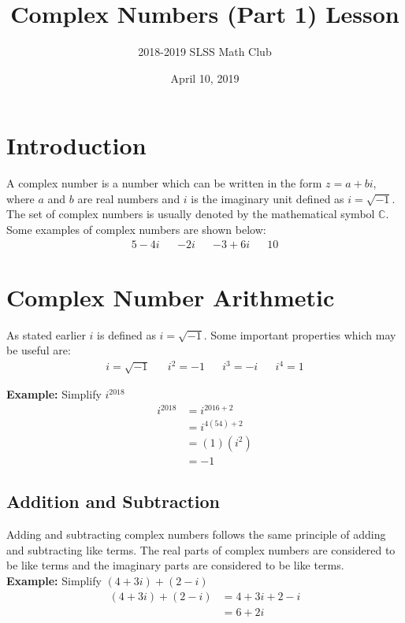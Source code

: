 \documentclass[12pt]{article}
\title{Complex Numbers (Part 1) Lesson\vspace{-3mm}}
\author{2018-2019 SLSS Math Club\vspace{-5mm}}
\date{April 10, 2019\vspace{-5mm}}
\begin{document}
\maketitle

\section{Introduction}
A complex number is a number which can be written in the form $z=a + bi$, where $a$ and $b$ are real numbers and $i$ is the imaginary unit defined as $i = \sqrt{-1}$. The set of complex numbers is usually denoted by the mathematical symbol $\mathbb{C}$. Some examples of complex numbers are shown below:
\begin{align*}
    5 - 4i && -2i && -3 + 6i && 10
\end{align*}

\section{Complex Number Arithmetic}
As stated earlier $i$ is defined as $i = \sqrt{-1}$. Some important properties which may be useful are:
\begin{align*}
    i = \sqrt{-1} && i^2 = -1 && i^3 = -i && i^4 = 1
\end{align*}

\textbf{Example:} Simplify $i^{2018}$
\begin{align*}
    i^{2018} &= i^{2016 + 2} \\
            &= i^{4(54) + 2} \\
            &= (1)(i^2) \\
            &= -1
\end{align*}

\subsection{Addition and Subtraction}
Adding and subtracting complex numbers follows the same principle of adding and subtracting like terms. The real parts of complex numbers are considered to be like terms and the imaginary parts are considered to be like terms. \\

\textbf{Example:} Simplify $(4 + 3i) + (2 - i)$
\begin{align*}
    (4 + 3i) + (2 - i) &= 4 + 3i + 2 - i \\
    &= 6 + 2i
\end{align*}
\end{document}
